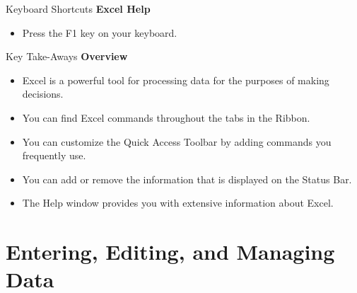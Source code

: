 \begin{center}
	\begin{shtcutbox}{Keyboard Shortcuts}
		\textbf{Excel Help}
		\\
		\begin{itemize}
			\setlength{\itemsep}{0pt}
			\setlength{\parskip}{0pt}
			\setlength{\parsep}{0pt}
			
			\item Press the F1 key on your keyboard.
			
		\end{itemize}
	\end{shtcutbox}
\end{center}


\begin{center}
	\begin{tkwbox}{Key Take-Aways}
		\textbf{Overview}
		\\
		\begin{itemize}
			\setlength{\itemsep}{0pt}
			\setlength{\parskip}{0pt}
			\setlength{\parsep}{0pt}
			
			\item Excel is a powerful tool for processing data for the purposes of making decisions.
			\item You can find Excel commands throughout the tabs in the Ribbon.
			\item You can customize the Quick Access Toolbar by adding commands you frequently use.
			\item You can add or remove the information that is displayed on the Status Bar.
			\item The Help window provides you with extensive information about Excel.
			
		\end{itemize}
	\end{tkwbox}
\end{center}

\section{Entering, Editing, and Managing Data}

